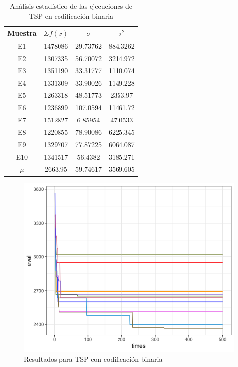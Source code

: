 \documentclass[letterpaper,12pt]{article}
\theoremstyle{definition}
\begin{document}
\begin{table}
  \begin{center}
    \begin{tabular}{cccc}
      \toprule 
        Muestra & \(\Sigma f(x)\) & \(\sigma\)  & \(\sigma^2\)  \\
        \midrule
        \rowcolor{black!20} E1 & 1478086 & 29.73762 & 884.3262 \\
        E2 & 1307335 & 56.70072 & 3214.972 \\
        \rowcolor{black!20} E3 & 1351190 & 33.31777 & 1110.074\\
        E4 & 1331309 & 33.90026 & 1149.228\\
        \rowcolor{black!20} E5 & 1263318 & 48.51773 & 2353.97 \\
        E6 & 1236899 & 107.0594 & 11461.72 \\
        \rowcolor{black!20} E7 & 1512827 & 6.85954 & 47.0533 \\
        E8 & 1220855 & 78.90086 & 6225.345\\
        \rowcolor{black!20} E9 & 1329707 & 77.87225 & 6064.087 \\
        E10 & 1341517 & 56.4382 & 3185.271 \\
        \rowcolor{black!20} \(\mu\) & 2663.95 & 59.74617 & 3569.605 \\ 
        \bottomrule
      \end{tabular}
  \end{center}
  \caption{Análisis estadístico de las ejecuciones de TSP en codificación binaria}
  \label{tab:tspbin}  
\end{table}

\begin{figure}[H]
  
  \includegraphics[width=\linewidth]{bin_tsp}
  \caption{Resultados para TSP con codificación binaria}
  \label{fig:tspbinaria}
\end{figure}
\end{document}
